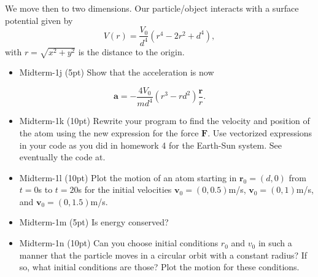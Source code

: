 \documentclass[%
oneside,                 %
final,                   %
10pt]{article}
\begin{document}
\noindent
We move then to two dimensions. Our particle/object interacts with a surface potential given by
\[
V(r)=\frac{V_0}{d^4}\left(r^4-2r^2+d^4\right),
\]
with $r=\sqrt{x^2+y^2}$ is the distance to the origin.

\begin{itemize}
\item Midterm-1j (5pt) Show that the acceleration is now
\end{itemize}

\noindent
\[
\bm{a}=-\frac{4V_0}{md^4}\left(r^3-rd^2\right)\frac{\bm{r}}{r}.
\]

\begin{itemize}
\item Midterm-1k (10pt) Rewrite your program to find the velocity and position of the atom using the new expression for the force $\bm{F}$. Use vectorized expressions in your code as you did in homework 4 for the Earth-Sun system. See eventually the code at.

\item Midterm-1l  (10pt) Plot the motion of an atom starting in $\bm{r}_0=(d,0)$ from $t=0$s to $t=20$s for the initial velocities $\bm{v}_0= (0,0.5)$m/s, $\bm{v}_0= (0,1)$m/s, and $\bm{v}_0= (0,1.5)$m/s.

\item Midterm-1m (5pt) Is energy conserved? 

\item Midterm-1n  (10pt) Can you choose initial conditions $r_0$ and $v_0$ in such a manner that the particle moves in a circular orbit with a constant radius? If so, what initial conditions are those? Plot the motion for these conditions.
\end{itemize}

\noindent


\end{document}
